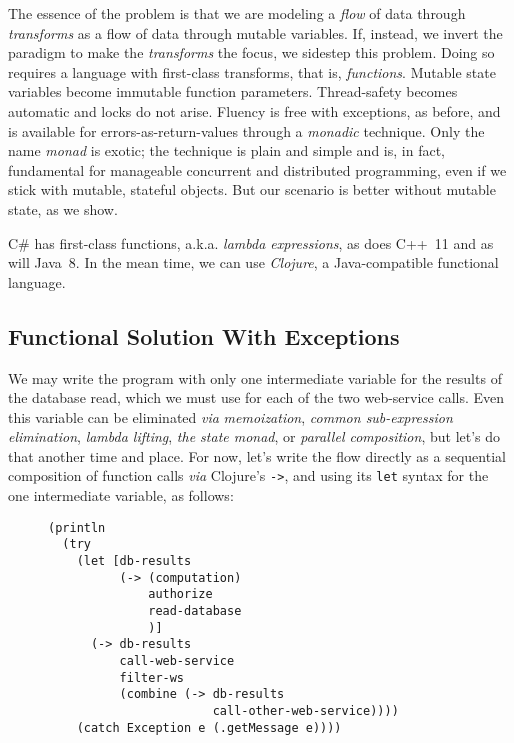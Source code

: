 \documentclass[11pt]{article}
\begin{document}
The essence of the problem is that we are modeling a \emph{flow} of data
through \emph{transforms} as a flow of data through mutable variables.
If, instead, we invert the paradigm to make the \emph{transforms} the
focus, we sidestep this problem. Doing so requires a language with
first-class transforms, that is, \emph{functions}. Mutable state
variables become immutable function parameters. Thread-safety
becomes automatic and locks do not arise. Fluency is free with
exceptions, as before, and is available for errors-as-return-values
through a \emph{monadic} technique. Only the name \emph{monad} is exotic; the
technique is plain and simple and is, in fact, fundamental for
manageable concurrent and distributed programming, even if we stick
with mutable, stateful objects. But our scenario is better without
mutable state, as we show.

\mbox{C\#} has first-class functions, a.k.a. \emph{lambda expressions}, as
does \mbox{C++ 11} and as will \mbox{Java 8}. In the mean time, we
can use \emph{Clojure}, a Java-compatible functional language.

\subsection{Functional Solution With Exceptions}
\label{sec-3-1}

We may write the program with only one intermediate variable for the
results of the database read, which we must use for each of the two
web-service calls. Even this variable can be eliminated \emph{via}
\emph{memoization}, \emph{common sub-expression elimination}, \emph{lambda
lifting}, \emph{the state monad}, or \emph{parallel composition}, but let's do
that another time and place. For now, let's write the flow directly
as a sequential composition of function calls \emph{via} Clojure's
\verb|->|, and using its \verb|let| syntax for the one intermediate
variable, as follows:

\begin{figure}[H]
\label{functional-main-1}
\begin{verbatim}
(println
  (try
    (let [db-results
          (-> (computation)
              authorize
              read-database
              )]
      (-> db-results
          call-web-service
          filter-ws
          (combine (-> db-results
                       call-other-web-service))))
    (catch Exception e (.getMessage e))))
\end{verbatim}
\end{figure}
\end{document}
